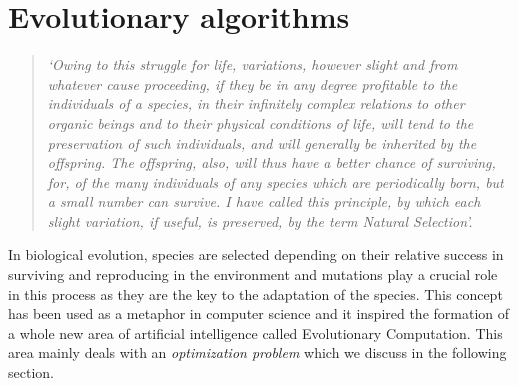 \chapter{Evolutionary algorithms}
\begin{quotation}
\textit{‘Owing to this struggle for life, variations, however slight and from whatever cause proceeding, if they be in any degree profitable to the individuals of a species, in their infinitely complex relations to other organic beings and to their physical conditions of life, will tend to the preservation of such individuals, and will generally be inherited by the offspring. The offspring, also, will thus have a better chance of surviving, for, of the many individuals of any species which are periodically born, but a small number can survive. I have called this principle, by which each slight variation, if useful, is preserved, by the term Natural Selection’.} \cite[p.~115]{Knuth}
\end{quotation}

In biological evolution, species are selected depending on their relative success in surviving and reproducing in the environment and mutations play a crucial role in this process as they are the key to the adaptation of the species. This concept has been used as a metaphor in computer science and it inspired the formation of a whole new area of artificial intelligence called Evolutionary Computation. This area mainly deals with an \textit{optimization problem} which we discuss in the following section.

